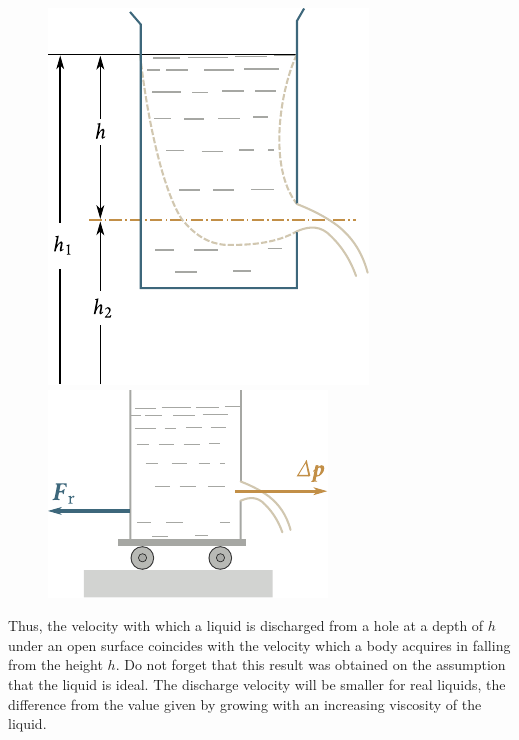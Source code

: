 \begin{figure}[t]
	\begin{minipage}[t]{0.5\linewidth}
		\begin{center}
			\includegraphics[scale=1.0]{figures/ch_09/fig_9_7.pdf}
			\caption[]{}
			\label{fig:9_7}
		\end{center}
	\end{minipage}
	\hspace{-0.0cm}
	\begin{minipage}[t]{0.5\linewidth}
		\begin{center}
			\includegraphics[scale=1.0]{figures/ch_09/fig_9_8.pdf}
			\caption[]{}
			\label{fig:9_8}
		\end{center}
	\end{minipage}
	\vspace{-0.4cm}
\end{figure}

Thus, the velocity with which a liquid is discharged from a hole at a depth of $h$ under an open surface coincides with the velocity which a body acquires in falling from the height $h$. Do not forget that this result was obtained on the assumption that the liquid is ideal. The discharge velocity will be smaller for real liquids, the difference from the value given by  growing with an increasing viscosity of the liquid.

